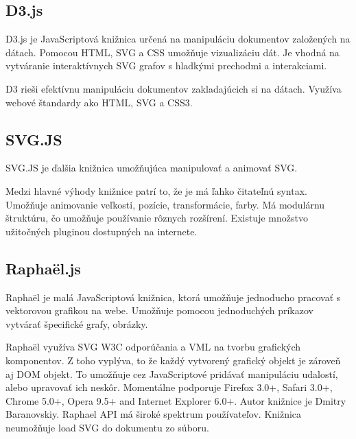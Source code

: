 

\subsection{D3.js}

D3.js je JavaScriptová knižnica určená na manipuláciu dokumentov založených na dátach. Pomocou \acs{HTML}, \acs{SVG} a \acs{CSS} umožňuje vizualizáciu dát.
Je vhodná na vytváranie interaktívnych SVG grafov s hladkými prechodmi a interakciami. 

D3 rieši efektívnu manipuláciu dokumentov zakladajúcich si na dátach. Využíva webové štandardy ako \acs{HTML}, \acs{SVG} a \acs{CSS}3. \cite{d3js}


\subsection{SVG.JS}

SVG.JS je ďalšia knižnica umožňujúca manipulovať a animovať SVG.

Medzi hlavné výhody knižnice patrí to, že je má ľahko čitateľnú syntax. Umožňuje animovanie veľkosti, pozície, transformácie, farby. Má modulárnu štruktúru, čo umožňuje používanie rôznych rozšírení. Existuje množstvo užitočných pluginou dostupných na internete. \cite{svgjs}



\subsection{Raphaël.js}

Raphaël je malá JavaScriptová knižnica, ktorá umožňuje jednoducho pracovať s vektorovou grafikou na webe. Umožňuje pomocou jednoduchých príkazov vytvárať špecifické grafy, obrázky. 

Raphaël využíva \acs{SVG} \acs{W3C} odporúčania a \acs{VML} na tvorbu grafických komponentov. Z toho vyplýva, to že každý vytvorený grafický objekt je zároveň aj DOM objekt. To umožňuje cez JavaScriptové pridávať manipuláciu udalostí, alebo upravovať ich neskôr.
Momentálne podporuje Firefox 3.0+, Safari 3.0+, Chrome 5.0+, Opera 9.5+ and Internet Explorer 6.0+.\cite{Raphael}
Autor knižnice je Dmitry Baranovskiy. Raphael API má široké spektrum používateľov. 
Knižnica neumožňuje load SVG do dokumentu zo súboru. 



